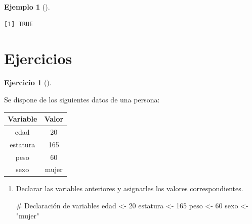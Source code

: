 \documentclass[
  a4paper,
]{scrreport}
\newenvironment{Shaded}{\begin{snugshade}}{\end{snugshade}}
\newcommand{\CommentTok}[1]{\textcolor[rgb]{0.37,0.37,0.37}{#1}}
\newcommand{\DecValTok}[1]{\textcolor[rgb]{0.68,0.00,0.00}{#1}}
\newcommand{\NormalTok}[1]{\textcolor[rgb]{0.00,0.23,0.31}{#1}}
\newcommand{\OtherTok}[1]{\textcolor[rgb]{0.00,0.23,0.31}{#1}}
\newcommand{\StringTok}[1]{\textcolor[rgb]{0.13,0.47,0.30}{#1}}
\theoremstyle{definition}
\newtheorem{exercise}{Ejercicio}[chapter]
\theoremstyle{definition}
\newtheorem{example}{Ejemplo}[chapter]
\theoremstyle{remark}
\begin{document}
\begin{example}[]
\begin{verbatim}
[1] TRUE
\end{verbatim}

\end{example}

\hypertarget{ejercicios}{%
\section{Ejercicios}\label{ejercicios}}

\begin{exercise}[]\protect\hypertarget{exr-tipos-datos-1}{}\label{exr-tipos-datos-1}

Se dispone de los siguientes datos de una persona:

\begin{longtable}[]{@{}cc@{}}
\toprule\noalign{}
Variable & Valor \\
\midrule\noalign{}
\endhead
\bottomrule\noalign{}
\endlastfoot
edad & 20 \\
estatura & 165 \\
peso & 60 \\
sexo & mujer \\
\end{longtable}

\begin{enumerate}
\def\labelenumi{\alph{enumi}.}
\item
  Declarar las variables anteriores y asignarles los valores
  correspondientes.

  \begin{tcolorbox}[enhanced jigsaw, colbacktitle=quarto-callout-note-color!10!white, breakable, opacitybacktitle=0.6, left=2mm, opacityback=0, leftrule=.75mm, colframe=quarto-callout-note-color-frame, bottomrule=.15mm, toprule=.15mm, toptitle=1mm, colback=white, titlerule=0mm, title=\textcolor{quarto-callout-note-color}{\faInfo}\hspace{0.5em}{Solución}, rightrule=.15mm, arc=.35mm, bottomtitle=1mm, coltitle=black]

\begin{Shaded}
\begin{Highlighting}[]
\CommentTok{\# Declaración de variables}
\NormalTok{edad }\OtherTok{\textless{}{-}} \DecValTok{20}
\NormalTok{estatura }\OtherTok{\textless{}{-}} \DecValTok{165}
\NormalTok{peso }\OtherTok{\textless{}{-}} \DecValTok{60}
\NormalTok{sexo }\OtherTok{\textless{}{-}} \StringTok{"mujer"}
\end{Highlighting}
\end{Shaded}


\end{tcolorbox}
\end{enumerate}
\end{exercise}
\end{document}

